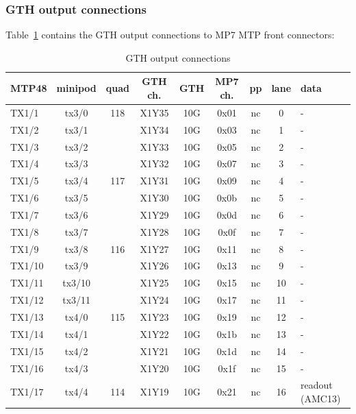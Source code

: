 \clearpage

\subsubsection{GTH output connections}\label{sec:app:gth_o_conn}

Table~\ref{tab:app:gth_o_conn} contains the GTH output connections to MP7 MTP front connectors:

\begin{longtable}{|l|c|c|c|c|c|c|c|l|}
\caption{GTH output connections}
    \label{tab:app:gth_o_conn}\\
\hline
\textbf{MTP48}& \textbf{minipod}& \textbf{quad}& \textbf{GTH ch.}& \textbf{GTH}& \textbf{MP7 ch.} &\textbf{pp}& \textbf{lane}& \textbf{data}\\
\hline
\hline
\endhead
TX1/1  & tx3/0  & 118 & X1Y35 & 10G & 0x01 & nc & 0  & -\\\hline
TX1/2  & tx3/1  &     & X1Y34 & 10G & 0x03 & nc & 1  & -\\\hline
TX1/3  & tx3/2  &     & X1Y33 & 10G & 0x05 & nc & 2  & -\\\hline
TX1/4  & tx3/3  &     & X1Y32 & 10G & 0x07 & nc & 3  & -\\\hline
TX1/5  & tx3/4  & 117 & X1Y31 & 10G & 0x09 & nc & 4  & -\\\hline
TX1/6  & tx3/5  &     & X1Y30 & 10G & 0x0b & nc & 5  & -\\\hline
TX1/7  & tx3/6  &     & X1Y29 & 10G & 0x0d & nc & 6  & -\\\hline
TX1/8  & tx3/7  &     & X1Y28 & 10G & 0x0f & nc & 7  & -\\\hline
TX1/9  & tx3/8  & 116 & X1Y27 & 10G & 0x11 & nc & 8  & -\\\hline
TX1/10 & tx3/9  &     & X1Y26 & 10G & 0x13 & nc & 9  & -\\\hline
TX1/11 & tx3/10 &     & X1Y25 & 10G & 0x15 & nc & 10 & -\\\hline
TX1/12 & tx3/11 &     & X1Y24 & 10G & 0x17 & nc & 11 & -\\\hline
TX1/13 & tx4/0  & 115 & X1Y23 & 10G & 0x19 & nc & 12 & -\\\hline
TX1/14 & tx4/1  &     & X1Y22 & 10G & 0x1b & nc & 13 & -\\\hline
TX1/15 & tx4/2  &     & X1Y21 & 10G & 0x1d & nc & 14 & -\\\hline
TX1/16 & tx4/3  &     & X1Y20 & 10G & 0x1f & nc & 15 & -\\\hline
TX1/17 & tx4/4  & 114 & X1Y19 & 10G & 0x21 & nc & 16 & readout (AMC13)\\\hline

\end{longtable}
